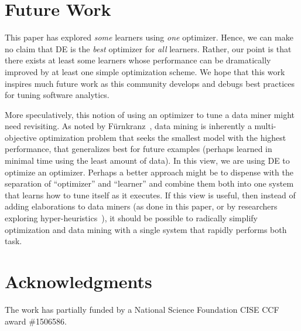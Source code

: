 \documentclass{sig-alternative}
\begin{document}
\section{Future Work}
 This paper has explored  {\em some} learners using {\em one}  optimizer. Hence, we can make
no claim that DE is the {\em best} optimizer for {\em all} learners.
Rather, our point is that there exists at least some learners
whose performance can be dramatically improved by 
at least one simple optimization scheme.  We hope that this work inspires
much future work as this community develops and debugs best practices for tuning
software analytics.

More speculatively,  this notion of using an optimizer to tune
a data miner might need revisiting. As noted by
F\"{u}rnkranz~\cite{furnkranz05}, data mining is inherently a multi-objective optimization
problem that seeks the smallest model with the highest performance, 
that generalizes best for
future examples (perhaps learned in minimal time using the least amount of data).
In this view, we are using DE to optimize an optimizer. Perhaps a better approach might be
to dispense with the separation of ``optimizer'' and ``learner'' and combine them both
into one system that learns how to tune itself as it executes. If this view is useful,
then instead of adding elaborations to data miners (as done in this paper, or by researchers
exploring hyper-heuristics~\cite{jia2013learning}), it should be possible to radically simplify optimization and data
mining with a single system that rapidly performs both task.

\section{Acknowledgments}
The work has partially funded by a National Science Foundation CISE CCF award \#1506586.
 
\vspace*{0.5mm}
 
 \scriptsize


\balance
  

   



  


  
\end{document}
